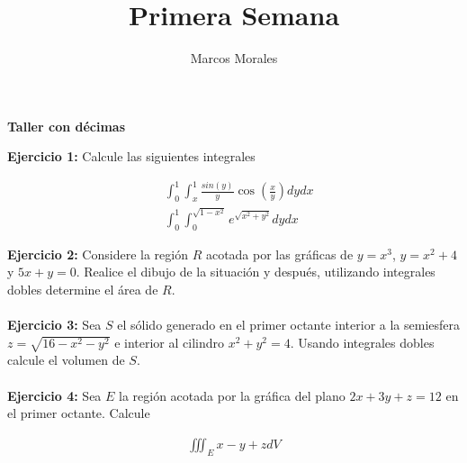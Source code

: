 \documentclass{article}
\author{Marcos Morales}
\affil{Universidad Finis Terrae}
\title{Primera Semana\\}
\theoremstyle{definition}
\begin{document}
\begin{center}
    \Large{\textbf{Taller con décimas}}
\end{center}


\setlength{\parindent}{0cm}


\textbf{Ejercicio 1:} Calcule las siguientes integrales 

\begin{align*}
    &\int_0^1\int_x^1 \frac{sin(y)}{y}\cos\left( \frac{x}{y}\right) dy dx \\
    &\int_0^1\int_0^{\sqrt{1-x^2}} e^{\sqrt{x^2+y^2}}dydx
\end{align*}





\textbf{Ejercicio 2:} Considere la región $R$ acotada por las gráficas de $y=x^3$, $y=x^2+4$ y $5x+y=0$. Realice el dibujo de la situación y después, utilizando integrales dobles determine el área de $R$. \\ \\








\textbf{Ejercicio 3:} Sea $S$ el sólido generado en el primer octante interior a la semiesfera $z=\sqrt{16-x^2-y^2}$ e interior al cilindro $x^2+y^2=4$. Usando integrales dobles calcule el volumen de $S$. \\ \\


\textbf{Ejercicio 4:} Sea $E$ la región acotada por la gráfica del plano $2x+3y+z=12$ en el primer octante. Calcule

\begin{align*}
    \iiint_E x-y+z dV
\end{align*}
\end{document}
